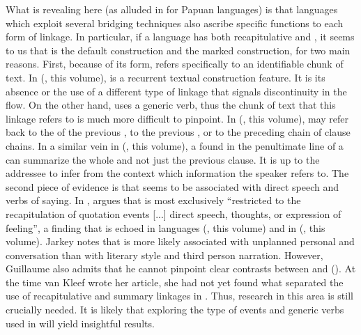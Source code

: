 \documentclass[output=paper]{LSP/langsci}
\begin{document}
What is revealing here (as alluded in \citealt{devries.2005} for Papuan languages) is that languages which exploit several bridging techniques also ascribe specific functions to each form of linkage. In particular, if a language has both recapitulative and , it seems to us that  is the default construction and  the marked construction, for two main reasons. First, because of its form,  refers specifically to an identifiable chunk of text. In  (\citeauthor{devries18}, this volume),  is a recurrent textual construction feature. It is its absence or the use of a different type of linkage that signals discontinuity in the  flow. On the other hand,  uses a generic verb, thus the chunk of text that this linkage refers to is much more difficult to pinpoint. In  (\citeauthor{devries18}, this volume),  may refer back to the  of the previous , to the previous , or to the preceding chain of clause chains. In a similar vein in  (\citeauthor{aiton18}, this volume), a  found in the penultimate line of a  can summarize the whole  and not just the previous clause. It is up to the addressee to infer from the context which information the speaker refers to. The second piece of evidence is that  seems to be associated with direct speech and verbs of saying. In , \citet[][128--131]{Guillaume2011} argues that  is most exclusively ``restricted to the recapitulation of quotation events [...] direct speech, thoughts, or expression of feeling'', a finding that is echoed in  languages (\citeauthor{anker18}, this volume) and in  (\citeauthor{jarkey18}, this volume). Jarkey notes that  is more likely associated with unplanned personal  and conversation than with literary style and third person narration. However, Guillaume also admits that he cannot pinpoint clear contrasts between  and  (\citeyear[][130]{Guillaume2011}). At the time van Kleef wrote her article, she had not yet found what separated the use of recapitulative and summary linkages in \citet[][155]{kleef88}. Thus, research in this area is still crucially needed. It is likely that exploring the type of events and generic verbs used in  will yield insightful results.
\end{document}
